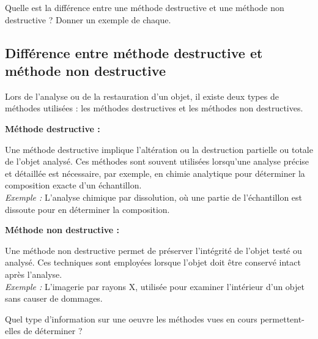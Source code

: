\documentclass[answers]{exam}
\begin{document}
\begin{questions}

\question[2] Quelle est la différence entre une méthode destructive et une méthode non destructive ? Donner un exemple de chaque.


\begin{solution}

\subsection*{Différence entre méthode destructive et méthode non destructive}

Lors de l'analyse ou de la restauration d'un objet, il existe deux types de méthodes utilisées : les méthodes destructives et les méthodes non destructives.

\begin{compactitem}
    \item \textbf{Méthode destructive :} 
        \begin{addmargin}[4em]{1em}
        Une méthode destructive implique l'altération ou la destruction partielle ou totale de l'objet analysé. Ces méthodes sont souvent utilisées lorsqu'une analyse précise et détaillée est nécessaire, par exemple, en chimie analytique pour déterminer la composition exacte d'un échantillon.\\
        \textit{Exemple :} L'analyse chimique par dissolution, où une partie de l'échantillon est dissoute pour en déterminer la composition.
        \end{addmargin}

    \item \textbf{Méthode non destructive :} 
        \begin{addmargin}[4em]{1em}
        Une méthode non destructive permet de préserver l'intégrité de l'objet testé ou analysé. Ces techniques sont employées lorsque l'objet doit être conservé intact après l'analyse.\\
        \textit{Exemple :} L'imagerie par rayons X, utilisée pour examiner l'intérieur d'un objet sans causer de dommages.
        \end{addmargin}
\end{compactitem}

\end{solution}

\question[2] Quel type d'information sur une oeuvre les méthodes vues en cours permettent-elles de déterminer ?


\begin{solution}


\end{solution}
\end{questions}
\end{document}
